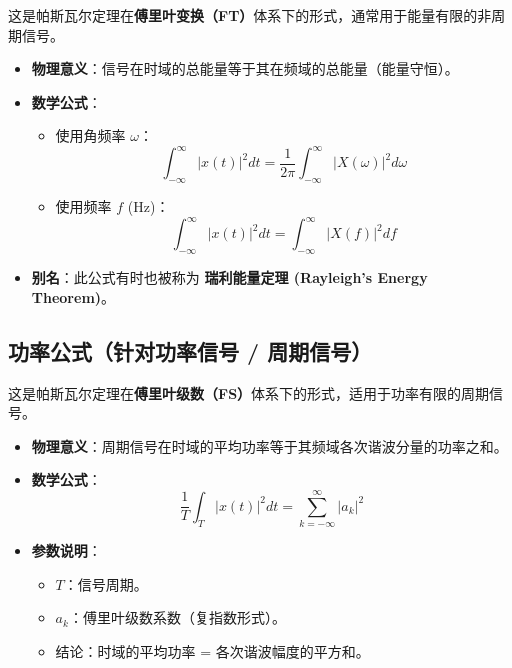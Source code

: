 这是帕斯瓦尔定理在\textbf{傅里叶变换（FT）}体系下的形式，通常用于能量有限的非周期信号。

\begin{itemize}
    \item \textbf{物理意义}：信号在时域的总能量等于其在频域的总能量（能量守恒）。
    \item \textbf{数学公式}：
    \begin{itemize}
        \item 使用角频率 $\omega$：
        \begin{equation*}
            \int_{-\infty}^{\infty} |x(t)|^2 dt = \frac{1}{2\pi} \int_{-\infty}^{\infty} |X(\omega)|^2 d\omega
        \end{equation*}
        \item 使用频率 $f$ (Hz)：
        \begin{equation*}
            \int_{-\infty}^{\infty} |x(t)|^2 dt = \int_{-\infty}^{\infty} |X(f)|^2 df
        \end{equation*}
    \end{itemize}
    \item \textbf{别名}：此公式有时也被称为 \textbf{瑞利能量定理 (Rayleigh's Energy Theorem)}。
\end{itemize}


\subsection{功率公式（针对功率信号 / 周期信号）}

这是帕斯瓦尔定理在\textbf{傅里叶级数（FS）}体系下的形式，适用于功率有限的周期信号。

\begin{itemize}
    \item \textbf{物理意义}：周期信号在时域的平均功率等于其频域各次谐波分量的功率之和。
    \item \textbf{数学公式}：
    \begin{equation*}
        \frac{1}{T} \int_{T} |x(t)|^2 dt = \sum_{k=-\infty}^{\infty} |a_k|^2
    \end{equation*}
    \item \textbf{参数说明}：
    \begin{itemize}
        \item $T$：信号周期。
        \item $a_k$：傅里叶级数系数（复指数形式）。
        \item 结论：时域的平均功率 = 各次谐波幅度的平方和。
    \end{itemize}
\end{itemize}



